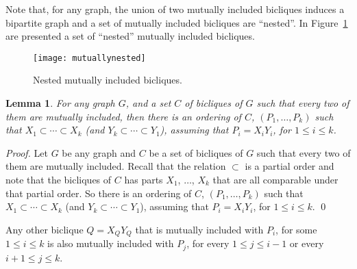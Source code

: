 \documentclass{article}
\newcommand{\margem}[2]
        {\mbox{}\marginpar{%
        \raggedright\textcolor{#2}{%
        \hspace{0pt}\bfseries\ssmall #1\\}}}
\newcommand{\comment}[3]{\margem{\textit{(#1)}\\ #3}{#2}}
\newtheorem{lemma}{Lemma}
\begin{document}
Note that, for  any graph, the union of two  mutually included bicliques
induces a bipartite  graph and a set of mutually  included bicliques are
``nested''.
In  Figure~\ref{fig:mutuallynested} are  presented a  set of
``nested'' mutually included bicliques.

\begin{figure}[htb]
  \centering
  \texttt{[image: mutuallynested]} 
  \caption{Nested mutually included bicliques.}
  \label{fig:mutuallynested}
\end{figure}

\begin{lemma}\label{lem.nested}
  For any graph $G$,  and a set $C$ of bicliques of  $G$ such that every
  two of them  are mutually included, then there is  an ordering of $C$,
  $(P_1, \ldots, P_k)$  such that $X_1 \subset \cdots  \subset X_k$ (and
  $Y_k \subset  \cdots \subset Y_1$),  assuming that $P_i=  X_iY_i$, for
  $1 \leq i \leq k$.
\end{lemma}
\begin{proof}
  Let $G$ be  any graph and $C$ be  a set of bicliques of  $G$ such that
  every two  of them  are mutually included.   Recall that  the relation
  $\subset$ is  a partial order and  note that the bicliques  of $C$ has
  parts  $X_1$,  $\ldots$, $X_k$  that  are  all comparable  under  that
  partial order.  So there is an  ordering of $C$, $(P_1,  \ldots, P_k)$
  such    that     $X_1    \subset    \cdots    \subset     X_k$    (and
  $Y_k \subset  \cdots \subset Y_1$),  assuming that $P_i=  X_iY_i$, for
  $1 \leq i \leq k$.
  \qed
\end{proof}

Any other  biclique $Q = X_QY_Q$  that is mutually included  with $P_i$,
for some  $1 \leq i  \leq k$ is also  mutually included with  $P_j$, for
every $1 \leq j \leq i-1$ or every $i+1 \leq j \leq k$.
\end{document}

